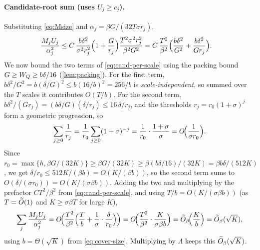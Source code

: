 \paragraph{Candidate-root sum (uses $U_j\ge c_j$).}
Substituting \eqref{eq:Msize} and $\alpha_j=\beta G/(32T\sigma r_j)$,
\begin{align}
  \frac{M_jU_j}{\alpha_j^2}
   &\le C\,\frac{b\delta^2}{\sigma^2 r_j^2}\Bigl(1+\frac G{r_j}\Bigr)\frac{T^2\sigma^2 r_j^2}{\beta^2G^2}
   = C\,\frac{T^2}{\beta^2}\Bigl(\frac{b\delta^2}{G^2}+\frac{b\delta^2}{G r_j}\Bigr).
   \label{eq:cand-per-scale}
\end{align}
We now bound the two terms of \eqref{eq:cand-per-scale} using the packing bound $G\ge W_Q\ge b\delta/16$
(\cref{lem:packing}). For the first term, $b\delta^2/G^2=b(\delta/G)^2\le b(16/b)^2=256/b$ is
\emph{scale-independent}, so summed over the $T$ scales it contributes $O(T/b)$. For the second term,
$b\delta^2/(Gr_j)=(b\delta/G)(\delta/r_j)\le 16\,\delta/r_j$, and the thresholds $r_j=r_0(1+\sigma)^j$ form
a geometric progression, so
\[
  \sum_{j\ge0}\frac1{r_j}=\frac1{r_0}\sum_{j\ge0}(1+\sigma)^{-j}=\frac1{r_0}\cdot\frac{1+\sigma}{\sigma}
   =O\!\Bigl(\frac1{\sigma r_0}\Bigr).
\]
Since $r_0=\max\{h,\beta G/(32K)\}\ge\beta G/(32K)\ge\beta(b\delta/16)/(32K)=\beta b\delta/(512K)$, we get
$\delta/r_0\le 512K/(\beta b)=O(K/(\beta b))$, so the second term sums to $O(\delta/(\sigma r_0))=
O(K/(\sigma\beta b))$. Adding the two and multiplying by the prefactor $CT^2/\beta^2$ from
\eqref{eq:cand-per-scale}, and using $T/b=O(K/(\sigma\beta b))$ (as $T=\widetilde{O}(1)$ and $K\ge\sigma\beta T$
for large $K$),
\begin{equation}\label{eq:cand-total}
  \sum_j \frac{M_jU_j}{\alpha_j^2}
   = O\!\Bigl(\frac{T^2}{\beta^2}\Bigl(\frac{T}{b}+\frac{1}{\sigma}\cdot\frac{\delta}{r_0}\Bigr)\Bigr)
   = O\!\Bigl(\frac{T^2}{\beta^2}\cdot\frac{K}{\sigma\beta b}\Bigr)
   = \widetilde{O}_\beta\!\Bigl(\frac Kb\Bigr)=\widetilde{O}_\beta(\sqrt K),
\end{equation}
using $b=\Theta(\sqrt K)$ from \eqref{eq:cover-size}. Multiplying by $\Lambda$ keeps this
$\widetilde{O}_\beta(\sqrt K)$.

